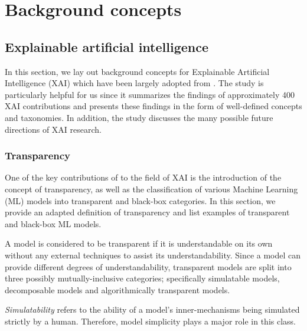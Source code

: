 \chapter{Background concepts}

\label{chapter:background}

\section{Explainable artificial intelligence}

\label{section:xai}

In this section, we lay out background concepts for Explainable Artificial
Intelligence (XAI) which have been largely adopted from
\citet{arrieta2020explainable}. The study is particularly helpful for us since
it summarizes the findings of approximately 400 XAI contributions and presents
these findings in the form of well-defined concepts and taxonomies. In addition,
the study discusses the many possible future directions of XAI research.

\subsection{Transparency}

One of the key contributions of \citet{arrieta2020explainable} to the field of
XAI is the introduction of the concept of transparency, as well as the
classification of various Machine Learning (ML) models into transparent and
black-box categories. In this section, we provide an adapted definition of
transparency and list examples of transparent and black-box ML models.

\begin{definition}
  A model is considered to be transparent if it is understandable on its own
  without any external techniques to assist its understandability. Since a model
  can provide different degrees of understandability, transparent models are
  split into three possibly mutually-inclusive categories; specifically
  simulatable models, decomposable models and algorithmically transparent
  models.
\end{definition}

\begin{remark}
  \textit{Simulatability} refers to the ability of a model's inner-mechanisms
  being simulated strictly by a human. Therefore, model simplicity plays a major
  role in this class.
\end{remark}

